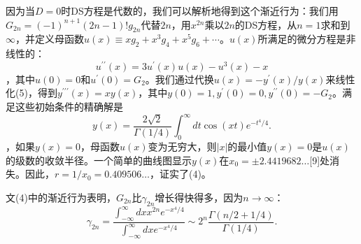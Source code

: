 \documentclass[UTF8]{article}
\begin{document}
因为当\( D=0 \)时DS方程是代数的，我们可以解析地得到这个渐近行为：我们用\( G_{2 n}=(-1)^{n+1}(2 n-1) ! g_{2 n} \)代替\( 2 n \)，用\( x^{2 n} \)乘以\( 2 n \)的DS方程，从\( n=1 \)求和到\( \infty \)，并定义母函数\( u(x) \equiv x g_{2}+x^{3} g_{4}+x^{5} g_{6}+\cdots \)。\( u(x) \)所满足的微分方程是非线性的：\[u^{\prime \prime}(x)=3 u^{\prime}(x) u(x)-u^{3}(x)-x
\]，其中\( u(0)=0 \)和\( u^{\prime}(0)=G_{2} \)。我们通过代换\( u(x)=-y^{\prime}(x) / y(x) \)来线性化(5)，得到\( y^{\prime \prime \prime}(x)=x y(x) \)，其中\( y(0)=1, y^{\prime}(0)=0, y^{\prime \prime}(0)=-G_{2} \)。满足这些初始条件的精确解是\[y(x)=\frac{2 \sqrt{2}}{\Gamma(1 / 4)} \int_{0}^{\infty} d t \cos (x t) e^{-t^{4} / 4} .
\]，如果\( y(x)=0 \)，母函数\( u(x) \)变为无穷大，则\( |x| \)的最小值\( y(x)=0 \)是\( u(x) \)的级数的收敛半径。一个简单的曲线图显示\( y(x) \)在\( x_{0}= \pm 2.4419682 \ldots \)[9]处消失。因此，\( r=1 / x_{0}=0.409506 \ldots \)，证实了(4)。


文(4)中的渐近行为表明，\( G_{2 n} \)比\( \gamma_{2 n} \)增长得快得多，因为\( n \rightarrow \infty \)：\[
\gamma_{2 n}=\frac{\int_{-\infty}^{\infty} d x x^{2 n} e^{-x^{4} / 4}}{\int_{-\infty}^{\infty} d x e^{-x^{4} / 4}} \sim 2^{n} \frac{\Gamma(n / 2+1 / 4)}{\Gamma(1 / 4)} .
\]
\end{document}
